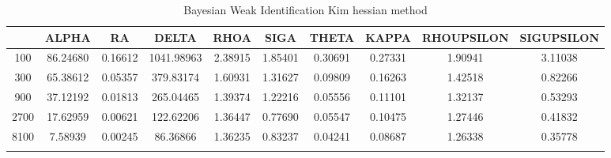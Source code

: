 \documentclass[a4paper,10pt]{article}
\begin{document}
\centering
\begin{longtable}{cccccccccc}
\toprule
 & ALPHA & RA & DELTA & RHOA & SIGA & THETA & KAPPA & RHOUPSILON & SIGUPSILON \\
\midrule
100 & 86.24680 & 0.16612 & 1041.98963 & 2.38915 & 1.85401 & 0.30691 & 0.27331 & 1.90941 & 3.11038 \\
300 & 65.38612 & 0.05357 & 379.83174 & 1.60931 & 1.31627 & 0.09809 & 0.16263 & 1.42518 & 0.82266 \\
900 & 37.12192 & 0.01813 & 265.04465 & 1.39374 & 1.22216 & 0.05556 & 0.11101 & 1.32137 & 0.53293 \\
2700 & 17.62959 & 0.00621 & 122.62206 & 1.36447 & 0.77690 & 0.05547 & 0.10475 & 1.27446 & 0.41832 \\
8100 & 7.58939 & 0.00245 & 86.36866 & 1.36235 & 0.83237 & 0.04241 & 0.08687 & 1.26338 & 0.35778 \\
\bottomrule
\caption{Bayesian Weak Identification Kim hessian method}
\label{table:tbl:WeakKim_hessian}
\end{longtable}
\end{document}
